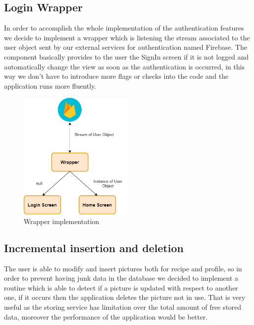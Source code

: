 \subsection{Login Wrapper}
In order to accomplish the whole implementation of the authentication features we decide to implement a wrapper which is listening the stream associated to the user object sent by our external services for authentication named Firebase.
The component basically provides to the user the SignIn screen if it is not logged and automatically change the view as soon as the authentication is occurred, in this way we don't have to introduce more flags or checks into the code and the application runs more fluently.
\begin{figure}[H]
		\begin{center}
			\centering
			\includegraphics[width=0.5\textwidth]{img/Wrapper.png}
			\caption{Wrapper implementation}
		\end{center}
	\end{figure}
\subsection{Incremental insertion and deletion}
The user is able to modify and insert pictures both for recipe and profile, so in order to prevent having junk data in the database we decided to implement a routine which is able to detect if a picture is updated with respect to another one, if it occurs then the application deletes the picture not in use.
That is very useful as the storing service has limitation over the total amount of free stored data, moreover the performance of the application would be better.
